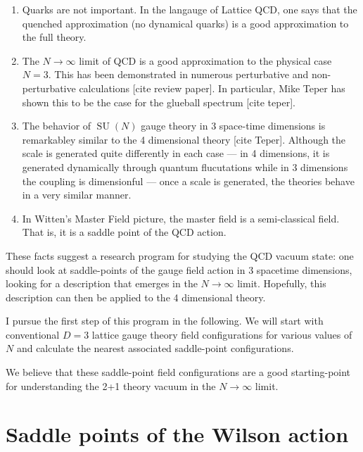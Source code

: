 \documentclass[preprint,aps]{revtex4}
\DeclareMathOperator{\SU}{SU}
\begin{document}
\begin{enumerate}

\item Quarks are not important.  In the langauge of Lattice QCD,
  one says that the quenched approximation (no dynamical
 quarks) is a good approximation to the full theory.

\item The $N\to\infty$ limit of QCD is a good approximation to the
  physical case $N=3$.  This has been demonstrated in numerous
  perturbative and non-perturbative calculations [cite review paper].
  In particular, Mike Teper has shown this to be the case for
  the glueball spectrum [cite teper].

\item The behavior of $\SU(N)$ gauge theory in 3 space-time dimensions
  is remarkabley similar to the 4 dimensional theory [cite Teper].
  Although the scale is generated quite differently in each case ---
  in 4 dimensions, it is generated dynamically through quantum
  flucutations while in 3 dimensions the coupling is dimensionful ---
  once a scale is generated, the theories behave in a very similar manner.

\item In Witten's Master Field picture, the master field is
  a semi-classical field.  That is, it is a saddle point
  of the QCD action.

\end{enumerate}

These facts suggest a research program for studying the QCD vacuum state:
one should look at saddle-points of the gauge field action
in 3 spacetime dimensions, looking for a description that emerges in
the $N\to \infty$ limit.  Hopefully, this description
can then be applied to the 4 dimensional theory.

I pursue the first step of this program in the following.
We will start with conventional $D=3$ lattice gauge
theory field configurations for various values of $N$ and
calculate the nearest associated saddle-point configurations.

We believe that these saddle-point field configurations
are a good starting-point for understanding the 2+1 theory
vacuum in the $N\to\infty$ limit.

\section{Saddle points of the Wilson action}
\label{two}
\end{document}
